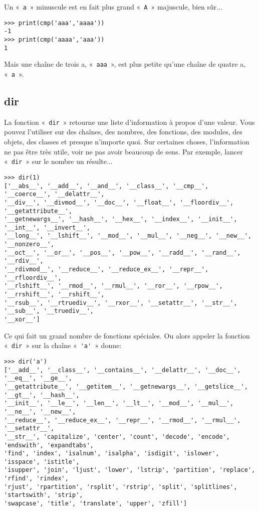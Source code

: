 Un «~\texttt{a}~» minuscule est en fait plus grand «~\texttt{A}~» majuscule, bien sûr...

\begin{Verbatim}[frame=single,rulecolor=\color{gray}]
>>> print(cmp('aaa','aaaa'))
-1
>>> print(cmp('aaaa','aaa'))
1
\end{Verbatim}

Mais une chaîne de trois a, «~\texttt{aaa}~», est plus petite qu'une chaîne de quatre a, «~\texttt{a}~».

\subsection*{dir}

La fonction «~\texttt{dir}~» retourne une liste d'information à propos d'une valeur. Vous pouvez l'utiliser sur des chaînes, des nombres, des fonctions, des modules, des objets, des classes et presque n'importe quoi. 
Sur certaines choses, l'information ne pas être très utile, voir ne pas avoir beaucoup de sens. Par exemple, lancer «~\texttt{dir}~»  sur le nombre un résulte...
\begin{small}
\begin{Verbatim}[frame=single,rulecolor=\color{gray}]
>>> dir(1)
['__abs__', '__add__', '__and__', '__class__', '__cmp__', '__coerce__', '__delattr__', 
'__div__', '__divmod__', '__doc__', '__float__', '__floordiv__', '__getattribute__', 
'__getnewargs__', '__hash__', '__hex__', '__index__', '__init__', '__int__', '__invert__', 
'__long__', '__lshift__', '__mod__', '__mul__', '__neg__', '__new__', '__nonzero__', 
'__oct__', '__or__', '__pos__', '__pow__', '__radd__', '__rand__', '__rdiv__', 
'__rdivmod__', '__reduce__', '__reduce_ex__', '__repr__', '__rfloordiv__', 
'__rlshift__', '__rmod__', '__rmul__', '__ror__', '__rpow__', '__rrshift__', '__rshift__',
'__rsub__', '__rtruediv__', '__rxor__', '__setattr__', '__str__', '__sub__', '__truediv__',
'__xor__']
\end{Verbatim}
\end{small}

Ce qui fait un grand nombre de fonctions spéciales. Ou alors appeler la fonction «~\texttt{dir}~» sur la chaîne «~\verb+'a'+~» donne:

\begin{small}
\begin{Verbatim}[frame=single,rulecolor=\color{gray}]
>>> dir('a')
['__add__', '__class__', '__contains__', '__delattr__', '__doc__', '__eq__', '__ge__', 
'__getattribute__', '__getitem__', '__getnewargs__', '__getslice__', '__gt__', '__hash__',
'__init__', '__le__', '__len__', '__lt__', '__mod__', '__mul__', '__ne__', '__new__', 
'__reduce__', '__reduce_ex__', '__repr__', '__rmod__', '__rmul__', '__setattr__', 
'__str__', 'capitalize', 'center', 'count', 'decode', 'encode', 'endswith', 'expandtabs', 
'find', 'index', 'isalnum', 'isalpha', 'isdigit', 'islower', 'isspace', 'istitle', 
'isupper', 'join', 'ljust', 'lower', 'lstrip', 'partition', 'replace', 'rfind', 'rindex', 
'rjust', 'rpartition', 'rsplit', 'rstrip', 'split', 'splitlines', 'startswith', 'strip', 
'swapcase', 'title', 'translate', 'upper', 'zfill']
\end{Verbatim}
\end{small}

